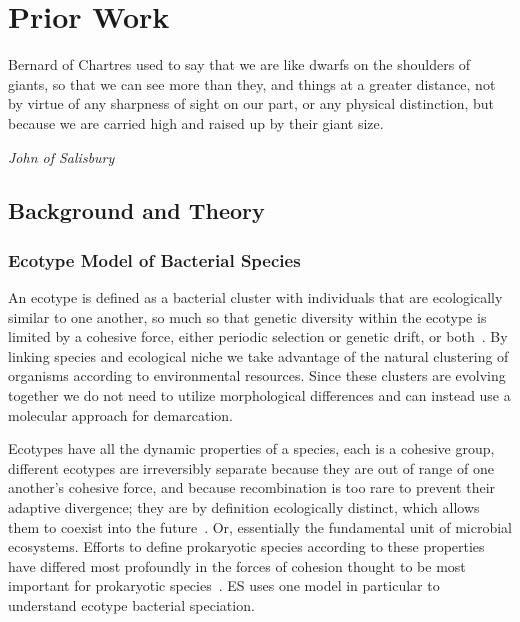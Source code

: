\chapter{Prior Work}


\begin{shadequote}
Bernard of Chartres used to say that we are like dwarfs on the shoulders of giants, so that we can see more than they, and things at a greater distance, not by virtue of any sharpness of sight on our part, or any physical distinction, but because we are carried high and raised up by their giant size.\par\emph{John of Salisbury}
\end{shadequote}


\section{Background and Theory}
\subsection*{Ecotype Model of Bacterial Species}
An ecotype is defined as a bacterial cluster with individuals that are ecologically similar to one another, so much so that genetic diversity within the ecotype is limited by a cohesive force, either periodic selection or genetic drift, or both~\cite{cohan2007systematics}.
By linking species and ecological niche we take advantage of the natural clustering of organisms according to environmental resources.
Since these clusters are evolving together we do not need to utilize morphological differences and can instead use a molecular approach for demarcation.

Ecotypes have all the dynamic properties of a species, each is a cohesive group, different ecotypes are irreversibly separate because they are out of range of one another's cohesive force, and because recombination is too rare to prevent their adaptive divergence; they are by definition ecologically distinct, which allows them to coexist into the future~\cite{cohan2007systematics}.
Or, essentially the fundamental unit of microbial ecosystems.
Efforts to define prokaryotic species according to these properties have differed most profoundly in the forces of cohesion thought to be most important for prokaryotic species~\cite{cohan2008origins}.
ES uses one model in particular to understand ecotype bacterial speciation.

